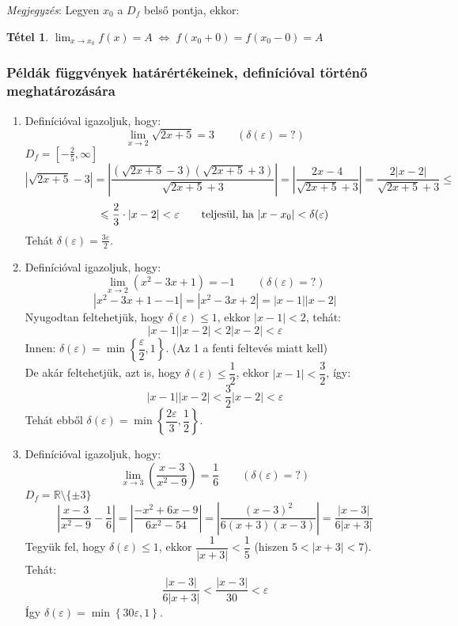 \documentclass[a4paper,12pt,twoside]{book}
\newtheorem{tetel}{Tétel}[chapter]
\theoremstyle{break}
\theoremstyle{plain}
\begin{document}
\emph{Megjegyzés}: Legyen $x_0$ a $D_f$ belső pontja, ekkor:
\begin{tetel}\label{HatarertekJobbEsBal}
 $\displaystyle \lim_{x\to x_0} f(x)=A \; \Leftrightarrow \; f(x_0+0)=f(x_0-0)=A$
\end{tetel}
\addtocounter{biz}{1}

\subsubsection{Példák függvények határértékeinek, definícióval történő meghatározására}

\begin{enumerate}
\renewcommand{\theenumi}{\pscirclebox[boxsep=false,linewidth=0.5pt,framesep=1pt]{\arabic{enumi}}}

 \item Definícióval igazoljuk, hogy: \[\lim_{x\to 2} \sqrt{2x+5} = 3 \qquad (\delta(\varepsilon) = ?)\]
  $D_f = \left[-\frac{2}{5},\infty\right]$
  \[|\sqrt{2x+5}-3|=\left|\frac{(\sqrt{2x+5}-3)(\sqrt{2x+5}+3)}{\sqrt{2x+5}+3}\right| = \left|\frac{2x-4}{\sqrt{2x+5}+3}\right| = \frac{2|x-2|}{\sqrt{2x+5}+3} \leqslant\]
  \[\leqslant \frac{2}{3}\cdot |x-2| < \varepsilon \qquad \hbox{teljesül, ha } |x-x_0|<\delta(\varepsilon)\]
  Tehát $\boxed{\delta(\varepsilon) = \frac{3\varepsilon}{2}}$.

 \item Definícióval igazoljuk, hogy: \[\lim_{x\to 2} (x^2-3x+1) = -1 \qquad (\delta(\varepsilon) = ?)\]
  \[|x^2-3x+1--1| = |x^2-3x+2| = |x-1||x-2|\]
  Nyugodtan feltehetjük, hogy $\delta(\varepsilon)\leqslant 1$, ekkor $|x-1|< 2$, tehát:
  \[|x-1||x-2| < 2|x-2| < \varepsilon\]
  Innen: $\delta(\varepsilon)=\min\left\{\dfrac{\varepsilon}{2}, 1\right\}$. (Az 1 a fenti feltevés miatt kell)\\
  De akár feltehetjük, azt is, hogy $\delta(\varepsilon)\leqslant \dfrac{1}{2}$, ekkor $|x-1|< \dfrac{3}{2}$, így:
  \[|x-1||x-2| < \dfrac{3}{2}|x-2| < \varepsilon\]
  Tehát ebből $\delta(\varepsilon)=\min\left\{\dfrac{2\varepsilon}{3}, \dfrac{1}{2}\right\}$.

 \item Definícióval igazoljuk, hogy: \[\lim_{x\to 3} \left(\frac{x-3}{x^2-9}\right) = \frac{1}{6} \qquad (\delta(\varepsilon) = ?)\]
  $D_f = \mathbb{R}\setminus\{\pm3\}$
  \[\left|\frac{x-3}{x^2-9}-\frac{1}{6}\right| = \left|\frac{-x^2+6x-9}{6x^2-54}\right| = \left|\frac{(x-3)^2}{6(x+3)(x-3)}\right| = \frac{|x-3|}{6|x+3|}\]
  Tegyük fel, hogy $\delta(\varepsilon)\leqslant 1$, ekkor $\dfrac{1}{|x+3|}< \dfrac{1}{5}$ (hiszen $5 < |x+3| < 7$). Tehát:
  \[\frac{|x-3|}{6|x+3|} < \frac{|x-3|}{30} < \varepsilon\]
  Így $\delta(\varepsilon)=\min\left\{30\varepsilon,1\right\}$.
\end{enumerate}
\end{document}
